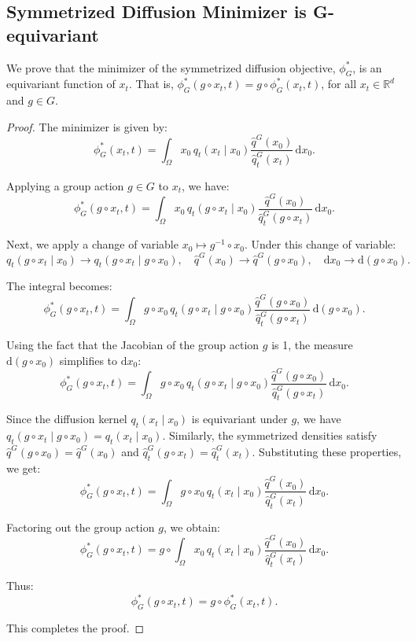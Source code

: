 \subsection{Symmetrized Diffusion Minimizer is G-equivariant}
\label{sub_app:sym_diff_mini}

We prove that the minimizer of the symmetrized diffusion objective, \(\phi^*_G\), is an equivariant function of \(x_t\). That is, \(\phi^*_G(g \circ x_t, t) = g \circ \phi^*_G(x_t, t)\), for all \(x_t \in \mathbb{R}^d\) and \(g \in G\).

\begin{proof}
The minimizer is given by:
\[
\phi^*_G(x_t, t) = \int_\Omega x_0 \, q_t(x_t \mid x_0) \frac{\hat{q}^G(x_0)}{\hat{q}^G_t(x_t)} \, \mathrm{d}x_0.
\]

Applying a group action \(g \in G\) to \(x_t\), we have:
\[
\phi^*_G(g \circ x_t, t) = \int_\Omega x_0 \, q_t(g \circ x_t \mid x_0) \frac{\hat{q}^G(x_0)}{\hat{q}^G_t(g \circ x_t)} \, \mathrm{d}x_0.
\]

Next, we apply a change of variable \(x_0 \mapsto g^{-1} \circ x_0\). Under this change of variable:
\[
q_t(g \circ x_t \mid x_0) \rightarrow q_t(g \circ x_t \mid g \circ x_0), \quad \hat{q}^G(x_0) \rightarrow \hat{q}^G(g \circ x_0), \quad \mathrm{d}x_0 \rightarrow \mathrm{d}(g \circ x_0).
\]

The integral becomes:
\[
\phi^*_G(g \circ x_t, t) = \int_\Omega g \circ x_0 \, q_t(g \circ x_t \mid g \circ x_0) \frac{\hat{q}^G(g \circ x_0)}{\hat{q}^G_t(g \circ x_t)} \, \mathrm{d}(g \circ x_0).
\]

Using the fact that the Jacobian of the group action \(g\) is 1, the measure \(\mathrm{d}(g \circ x_0)\) simplifies to \(\mathrm{d}x_0\):
\[
\phi^*_G(g \circ x_t, t) = \int_\Omega g \circ x_0 \, q_t(g \circ x_t \mid g \circ x_0) \frac{\hat{q}^G(g \circ x_0)}{\hat{q}^G_t(g \circ x_t)} \, \mathrm{d}x_0.
\]

Since the diffusion kernel \(q_t(x_t \mid x_0)\) is equivariant under \(g\), we have \(q_t(g \circ x_t \mid g \circ x_0) = q_t(x_t \mid x_0)\). Similarly, the symmetrized densities satisfy \(\hat{q}^G(g \circ x_0) = \hat{q}^G(x_0)\) and \(\hat{q}^G_t(g \circ x_t) = \hat{q}^G_t(x_t)\). Substituting these properties, we get:
\[
\phi^*_G(g \circ x_t, t) = \int_\Omega g \circ x_0 \, q_t(x_t \mid x_0) \frac{\hat{q}^G(x_0)}{\hat{q}^G_t(x_t)} \, \mathrm{d}x_0.
\]

Factoring out the group action \(g\), we obtain:
\[
\phi^*_G(g \circ x_t, t) = g \circ \int_\Omega x_0 \, q_t(x_t \mid x_0) \frac{\hat{q}^G(x_0)}{\hat{q}^G_t(x_t)} \, \mathrm{d}x_0.
\]

Thus:
\[
\phi^*_G(g \circ x_t, t) = g \circ \phi^*_G(x_t, t).
\]

This completes the proof.
\end{proof}



